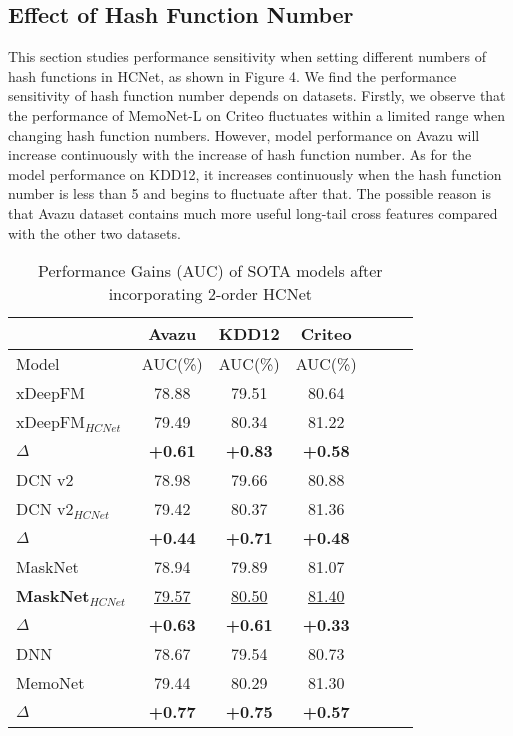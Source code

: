 \documentclass[sigconf,authorversion]{acmart}
\begin{document}
\subsection{Effect of Hash Function Number}
This section studies performance sensitivity when setting different numbers of hash functions in HCNet, as shown in Figure 4. We find the performance sensitivity of hash function number depends on datasets. Firstly, we observe that the performance of MemoNet-L on Criteo fluctuates within a limited range when changing hash function numbers. However, model performance on Avazu will increase continuously with the increase of hash function number. As for the model performance on KDD12, it increases continuously when the hash function number is less than 5 and begins to fluctuate after that. The possible reason is that Avazu dataset contains much more useful long-tail cross features compared with the other two datasets.


\begin{table}
\centering
\caption{Performance Gains (AUC) of SOTA models after incorporating 2-order HCNet}
\begin{tabular}{l|cccccc}
\toprule
  & \multicolumn{1}{c}{\textbf{Avazu}}  & \multicolumn{1}{c}{\textbf{KDD12} } & \multicolumn{1}{c}{\textbf{Criteo}} \\
\midrule
Model & AUC(\%)   & AUC(\%)   & AUC(\%)    \\
\midrule
xDeepFM       & 78.88    &  79.51  & 80.64    \\
 xDeepFM${_{HCNet}} $       & 79.49    & 80.34  & 81.22    \\
\quad \quad$\Delta$           & \textbf{+0.61}  &\textbf{+0.83} &\textbf{+0.58}  \\
 \midrule 
 DCN v2       & 78.98    &  79.66  & 80.88    \\
 DCN v2${_{HCNet}} $       & 79.42    & 80.37  & 81.36    \\
\quad \quad$\Delta$           & \textbf{+0.44}  &\textbf{+0.71} &\textbf{+0.48}  \\
 \midrule 
MaskNet       & 78.94    &  79.89  & 81.07    \\
\textbf{MaskNet${_{HCNet}} $  }     & \underline{79.57}   & \underline{80.50}  & \underline{81.40}    \\
\quad\quad $\Delta$           & \textbf{+0.63}  &\textbf{+0.61} &\textbf{+0.33}  \\
 \midrule 
 \midrule 
DNN       & 78.67    &  79.54  & 80.73    \\
MemoNet       & 79.44    & 80.29  & 81.30    \\
\quad\quad $\Delta$           & \textbf{+0.77}  &\textbf{+0.75} &\textbf{+0.57}  \\
 

\bottomrule
\end{tabular}\label{tab:performancegains}
\end{table}
\end{document}
